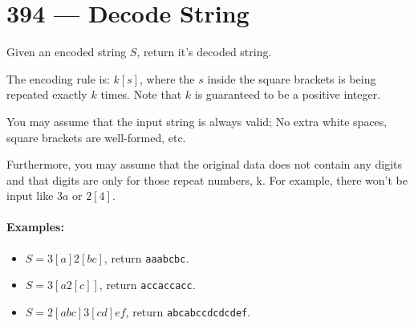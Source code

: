 \section{394 --- Decode String}
Given an encoded string $S$, return it's decoded string.
\par
The encoding rule is: $k[s]$, where the $s$ inside the square brackets is being repeated exactly $k$ times. Note that $k$ is guaranteed to be a positive integer.
\par
You may assume that the input string is always valid; No extra white spaces, square brackets are well-formed, etc.
\par
Furthermore, you may assume that the original data does not contain any digits and that digits are only for those repeat numbers, k. For example, there won't be input like $3a$ or $2[4]$.

\paragraph{Examples:}

\begin{itemize}
\item $S = 3[a]2[bc]$, return \texttt{aaabcbc}.
\item $S = 3[a2[c]]$, return \texttt{accaccacc}.
\item $S = 2[abc]3[cd]ef$, return \texttt{abcabccdcdcdef}.
\end{itemize}
